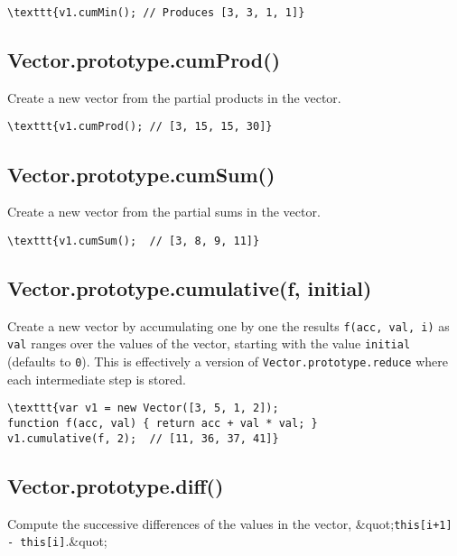 \documentclass{article}
\begin{document}
\begin{lstlisting}
\texttt{v1.cumMin(); // Produces [3, 3, 1, 1]}\end{lstlisting}

    \subsection*{Vector.prototype.cumProd()}
    Create a new vector from the partial products in the vector.


\begin{lstlisting}
\texttt{v1.cumProd(); // [3, 15, 15, 30]}\end{lstlisting}

    \subsection*{Vector.prototype.cumSum()}
    Create a new vector from the partial sums in the vector.


\begin{lstlisting}
\texttt{v1.cumSum();  // [3, 8, 9, 11]}\end{lstlisting}

    \subsection*{Vector.prototype.cumulative(f, initial)}
    Create a new vector by accumulating one by one the results
\texttt{f(acc, val, i)} as \texttt{val} ranges over the values of the vector,
starting with the value \texttt{initial} (defaults to \texttt{0}). This is effectively a version of
\texttt{Vector.prototype.reduce} where each intermediate step is stored.


\begin{lstlisting}
\texttt{var v1 = new Vector([3, 5, 1, 2]);
function f(acc, val) { return acc + val * val; }
v1.cumulative(f, 2);  // [11, 36, 37, 41]}\end{lstlisting}

    \subsection*{Vector.prototype.diff()}
    Compute the successive differences of the values in the vector, \&quot;\texttt{this[i+1] - this[i]}.\&quot;
\end{document}
